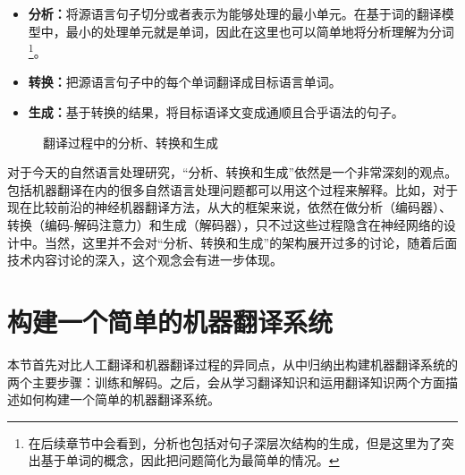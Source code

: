 \begin{itemize}
\vspace{0.5em}
\item {\small\sffamily\bfseries{分析：}}将源语言句子切分或者表示为能够处理的最小单元。在基于词的翻译模型中，最小的处理单元就是单词，因此在这里也可以简单地将分析理解为分词\footnote{在后续章节中会看到，分析也包括对句子深层次结构的生成，但是这里为了突出基于单词的概念，因此把问题简化为最简单的情况。}。
\vspace{0.5em}
\item {\small\sffamily\bfseries{转换：}}把源语言句子中的每个单词翻译成目标语言单词。
\vspace{0.5em}
\item {\small\sffamily\bfseries{生成：}}基于转换的结果，将目标语译文变成通顺且合乎语法的句子。
\vspace{0.5em}
\end{itemize}

\begin{figure}[htp]
 \centering

    \caption{翻译过程中的分析、转换和生成}
    \label{fig:3-2}
\end{figure}

\parinterval 对于今天的自然语言处理研究，``分析、转换和生成''依然是一个非常深刻的观点。包括机器翻译在内的很多自然语言处理问题都可以用这个过程来解释。比如，对于现在比较前沿的神经机器翻译方法，从大的框架来说，依然在做分析（编码器）、转换（编码-解码注意力）和生成（解码器），只不过这些过程隐含在神经网络的设计中。当然，这里并不会对``分析、转换和生成''的架构展开过多的讨论，随着后面技术内容讨论的深入，这个观念会有进一步体现。


\sectionnewpage
\section{构建一个简单的机器翻译系统}
\label{sec:simple-mt-example}

\parinterval 本节首先对比人工翻译和机器翻译过程的异同点，从中归纳出构建机器翻译系统的两个主要步骤：训练和解码。之后，会从学习翻译知识和运用翻译知识两个方面描述如何构建一个简单的机器翻译系统。



